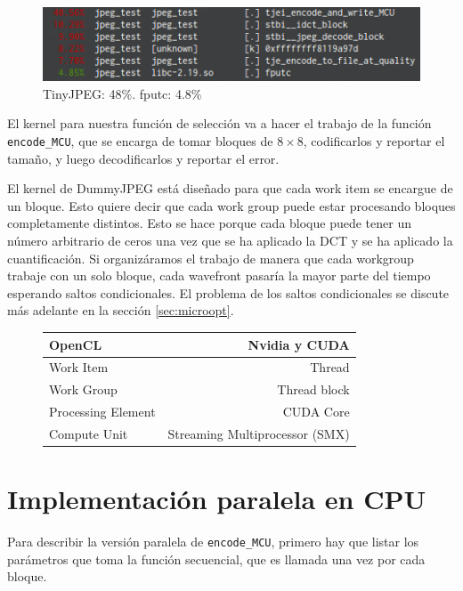 \begin{figure}[ht]
    \includegraphics[width=4.5625in]{fputc}
    \caption{TinyJPEG: 48\%. fputc: 4.8\%}
\end{figure}

El kernel para nuestra función de selección va a hacer el trabajo de la función
\verb+encode_MCU+, que se encarga de tomar bloques de $8\times8$, codificarlos
y reportar el tamaño, y luego decodificarlos y reportar el error.

El kernel de DummyJPEG está diseñado para que cada work item se encargue de un
bloque. Esto quiere decir que cada work group puede estar procesando bloques
completamente distintos. Esto se hace porque cada bloque puede tener un número
arbitrario de ceros una vez que se ha aplicado la \gls{DCT} y se ha aplicado la
cuantificación. Si organizáramos el trabajo de manera que cada workgroup trabaje
con un solo bloque, cada wavefront pasaría la mayor parte del tiempo esperando saltos
condicionales. El problema de los saltos condicionales se discute más adelante
en la sección \ref{sec:microopt}.

\begin {figure}
    \begin{tabular}{ | l | r | }
    \hline
    OpenCL             & Nvidia y CUDA \\
    \hline
    Work Item          & Thread \\
    Work Group         & Thread block \\
    Processing Element & CUDA Core \\
    Compute Unit       & Streaming Multiprocessor (SMX) \\
    \hline
    \end{tabular}
    \label{table:equiv}
\end{figure}

\section{Implementación paralela en CPU}

Para describir la versión paralela de \verb+encode_MCU+, primero hay que listar
los parámetros que toma la función secuencial, que es llamada una vez por cada
bloque.

